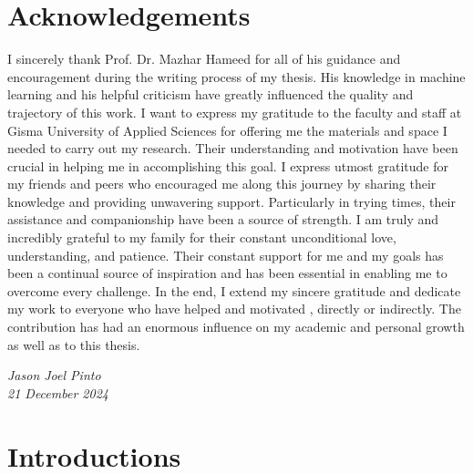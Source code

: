 \documentclass[12pt,onecolumn]{report}
\begin{document}
\chapter*{Acknowledgements}
I sincerely thank Prof. Dr. Mazhar Hameed for all of his guidance and encouragement during the writing process of my thesis. His knowledge in machine learning and his helpful criticism have greatly influenced the quality and trajectory of this work.
I want to express my gratitude to the faculty and staff at Gisma University of Applied Sciences for offering me the materials and space I needed to carry out my research. Their understanding and motivation have been crucial in helping me in accomplishing this goal.
I express utmost gratitude for my friends and peers who encouraged me along this journey by sharing their knowledge and providing unwavering support. Particularly in trying times, their assistance and companionship have been a source of strength.
I am truly and incredibly grateful to my family for their constant unconditional love, understanding, and patience. Their constant support for me and my goals has been a continual source of inspiration and has been essential in enabling me to overcome every challenge.
In the end, I extend my sincere gratitude and dedicate my work to everyone who have helped and motivated , directly or indirectly. The contribution has had an enormous influence on my academic and personal growth as well as to this thesis.
\begin{flushright}
    \textit{Jason Joel Pinto} \\
    \textit{21 December 2024}
\end{flushright}
\vfill



\tableofcontents
\listoffigures %
\listoftables  %

\chapter{Introductions}
\thispagestyle{fancy}
\end{document}
